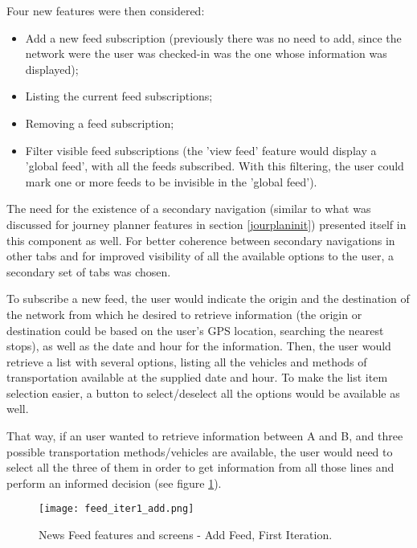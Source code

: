 Four new features were then considered: 

\begin{itemize}
\item Add a new feed subscription (previously there was no need to add, since the network were the user was checked-in was the one whose information was displayed);
\item Listing the current feed subscriptions;
\item Removing a feed subscription;
\item Filter visible feed subscriptions (the 'view feed' feature would display a 'global feed', with all the feeds subscribed. With this filtering, the user could mark one or more feeds to be invisible in the 'global feed').
\end{itemize}

The need for the existence of a secondary navigation (similar to what was discussed for journey planner features in section \ref{jourplaninit}) presented itself in this component as well. For better coherence between secondary navigations in other tabs and for improved visibility of all the available options to the user, a secondary set of tabs was chosen.

To subscribe a new feed, the user would indicate the origin and the destination of the network from which he desired to retrieve information (the origin or destination could be based on the user's GPS location, searching the nearest stops), as well as the date and hour for the information. 
Then, the user would retrieve a list with several options, listing all the vehicles and methods of transportation available at the supplied date and hour. To make the list item selection easier, a button to select/deselect all the options would be available as well.

That way, if an user wanted to retrieve information between A and B, and three possible transportation methods/vehicles are available, the user would need to select all the three of them in order to get information from all those lines and perform an informed decision (see figure \ref{fig:feed_iter1_add}).

\begin{figure}[htb]
  \begin{center}
    \leavevmode
    \texttt{[image: feed\_iter1\_add.png]}
    \caption{News Feed features and screens - Add Feed, First Iteration.}
    \label{fig:feed_iter1_add}
  \end{center}
\end{figure}




